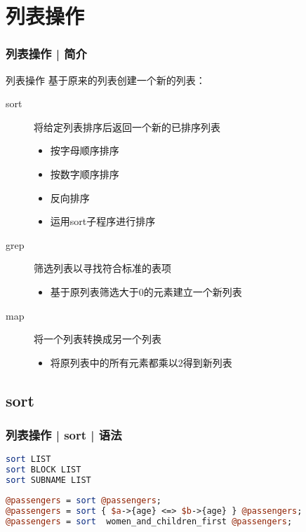 \section{列表操作}
\begin{frame}
  \frametitle{列表操作 | 简介}
  \begin{block}{\alert{列表操作}}
    基于原来的列表创建一个新的列表：
    \begin{description}
      \item[sort] 将给定列表排序后返回一个新的已排序列表
        \begin{itemize}
          \item 按字母顺序排序 
          \item 按数字顺序排序
          \item 反向排序
          \item 运用sort子程序进行排序
        \end{itemize}
      \item[grep] 筛选列表以寻找符合标准的表项
        \begin{itemize}
          \item 基于原列表筛选大于0的元素建立一个新列表
        \end{itemize}
      \item[map] 将一个列表转换成另一个列表
        \begin{itemize}
          \item 将原列表中的所有元素都乘以2得到新列表
        \end{itemize}
    \end{description}
  \end{block}
\end{frame}

\subsection{sort}
\begin{frame}[fragile]
  \frametitle{列表操作 | sort | \alert{语法}}
\begin{lstlisting}[language=Perl]
sort LIST
sort BLOCK LIST
sort SUBNAME LIST
\end{lstlisting}
  \pause
\begin{lstlisting}[language=Perl]
@passengers = sort @passengers;
@passengers = sort { $a->{age} <=> $b->{age} } @passengers;
@passengers = sort  women_and_children_first @passengers;
\end{lstlisting}
\end{frame}

